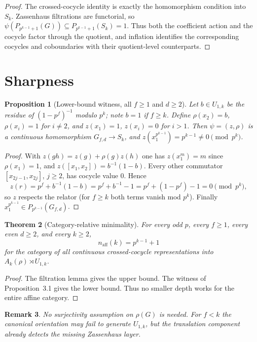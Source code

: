 \documentclass[11pt]{article}
\newtheorem{theorem}{Theorem}[section]
\newtheorem{proposition}[theorem]{Proposition}
\newtheorem{remark}[theorem]{Remark}
\begin{document}
\begin{proof}
The crossed-cocycle identity is exactly the homomorphism condition into $S_k$. Zassenhaus filtrations are functorial, so
$\psi(P_{p^{k-1}+1}(G))\subseteq P_{p^{k-1}+1}(S_k)=1$.
Thus both the coefficient action and the cocycle factor through the quotient, and inflation identifies the corresponding cocycles and coboundaries with their quotient-level counterparts.
\end{proof}

\section{Sharpness}
\begin{proposition}[Lower-bound witness, all $f\ge1$ and $d\ge2$]
Let $b\in U_{1,k}$ be the residue of $(1-p^f)^{-1}$ modulo $p^k$; note
$b=1$ if $f\ge k$. Define $\rho(x_2)=b$,
$\rho(x_i)=1$ for $i\ne2$, and
$z(x_1)=1$, $z(x_i)=0$ for $i>1$.
Then $\psi=(z,\rho)$ is a continuous homomorphism $G_{f,d}\to S_k$, and
$z(x_1^{p^{k-1}})=p^{k-1}\neq0\pmod{p^k}$.
\end{proposition}

\begin{proof}
With $z(gh)=z(g)+\rho(g)z(h)$ one has $z(x_1^m)=m$ since $\rho(x_1)=1$, and
$z([x_1,x_2])=b^{-1}(1-b)$. Every other commutator
$[x_{2j-1},x_{2j}]$, $j\ge2$, has cocycle value $0$. Hence
\[
z(r)=p^f+b^{-1}(1-b)=p^f+b^{-1}-1=p^f+(1-p^f)-1=0\pmod{p^k},
\]
so $z$ respects the relator (for $f\ge k$ both terms vanish mod $p^k$).
Finally $x_1^{p^{k-1}}\in P_{p^{k-1}}(G_{f,d})$.
\end{proof}

\begin{theorem}[Category-relative minimality]
For every odd $p$, every $f\ge1$, every even $d\ge2$, and every $k\ge2$,
\[
\boxed{n_{\mathrm{aff}}(k)=p^{k-1}+1}
\]
for the category of all continuous crossed-cocycle representations into $A_k(\rho)\rtimes U_{1,k}$.
\end{theorem}

\begin{proof}
The filtration lemma gives the upper bound. The witness of Proposition~3.1 gives the lower bound. Thus no smaller depth works for the entire affine category.
\end{proof}

\begin{remark}
No surjectivity assumption on $\rho(G)$ is needed. For $f<k$ the canonical orientation may fail to generate $U_{1,k}$, but the translation component already detects the missing Zassenhaus layer.
\end{remark}
\end{document}
